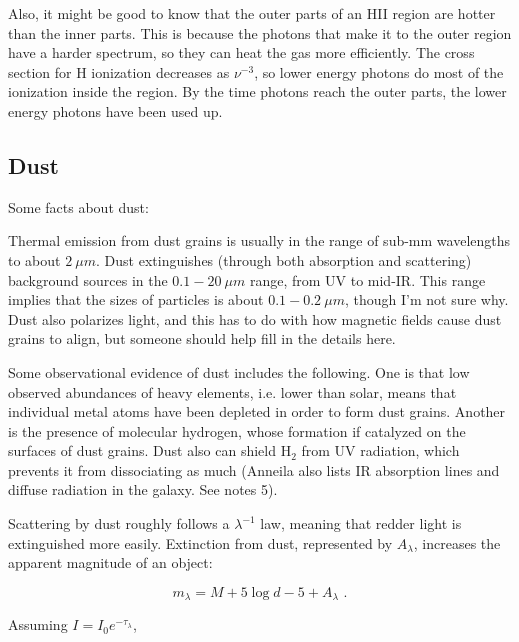 Also, it might be good to know that the outer parts of an HII region are hotter than the inner 
parts.  This is because the photons that make it to the outer region have a harder spectrum, so 
they can heat the gas more efficiently.  The cross section for H ionization decreases as 
$\nu^{-3}$, so lower energy photons do most of the ionization inside the region.  By the time 
photons reach the outer parts, the lower energy photons have been used up.  

\subsection{Dust}

Some facts about dust:

Thermal emission from dust grains is usually in the range of sub-mm wavelengths to about $2~\mu m$. Dust extinguishes (through both absorption and scattering) background sources in the $0.1-20~\mu m$ range, from UV to mid-IR. This range implies that the sizes of particles is about $0.1-0.2~\mu m$, though I'm not sure why. Dust also polarizes light, and this has to do with how magnetic fields cause dust grains to align, but someone should help fill in the details here.

Some observational evidence of dust includes the following. One is that low observed abundances of heavy elements, i.e. lower than solar, means that individual metal atoms have been depleted in order to form dust grains. Another is the presence of molecular hydrogen, whose formation if catalyzed on the surfaces of dust grains. Dust also can shield H$_2$ from UV radiation, which prevents it from dissociating as much (Anneila also lists IR absorption lines and diffuse radiation in the galaxy. See notes 5).

Scattering by dust roughly follows a $\lambda^{-1}$ law, meaning that redder light is extinguished more easily. Extinction from dust, represented by $A_\lambda$, increases the apparent magnitude of an object:

\begin{equation}
m_\lambda = M + 5 \log d - 5 + A_\lambda \,\, .
\end{equation}

Assuming $I = I_0 e^{-\tau_\lambda}$,


